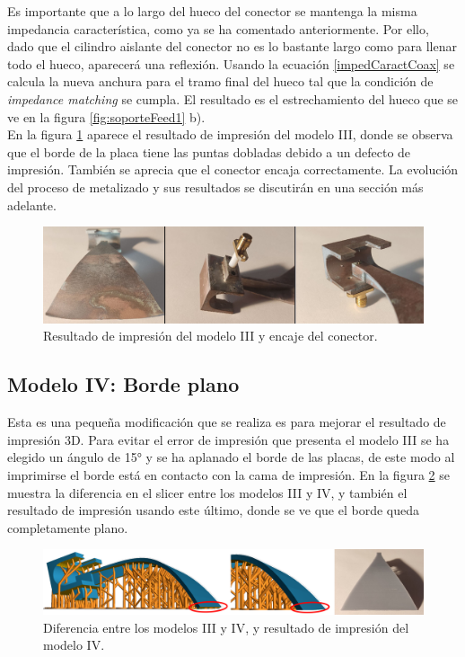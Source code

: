 \documentclass[11pt,a4paper,twoside,pdf]{article}
\numberwithin{equation}{section}
\begin{document}
Es importante que a lo largo del hueco del conector se mantenga la misma impedancia característica, como ya se ha comentado anteriormente. Por ello, dado que el cilindro aislante del conector no es lo bastante largo como para llenar todo el hueco, aparecerá una reflexión. Usando la ecuación \ref{impedCaractCoax} se calcula la nueva anchura para el tramo final del hueco tal que la condición de \textit{impedance matching} se cumpla. El resultado es el estrechamiento del hueco que se ve en la figura \ref{fig:soporteFeed1} b).\\

En la figura \ref{fig:bordeDoblado} aparece el resultado de impresión del modelo III, donde se observa que el borde de la placa tiene las puntas dobladas debido a un defecto de impresión. También se aprecia que el conector encaja correctamente. La evolución del proceso de metalizado y sus resultados se discutirán en una sección más adelante.
\begin{figure}[!h]
    \centering
    \includegraphics[width=\linewidth]{img/modelos/2025_03_19-ConectorV2/bordeDoblado.png}
    \vspace{-0.5cm}
    \caption{Resultado de impresión del modelo III y encaje del conector.}
    \label{fig:bordeDoblado}
\end{figure}

\subsection{Modelo IV: Borde plano}

Esta es una pequeña modificación que se realiza es para mejorar el resultado de impresión 3D. Para evitar el error de impresión que presenta el modelo III se ha elegido un ángulo de 15° y se ha aplanado el borde de las placas, de este modo al imprimirse el borde está en contacto con la cama de impresión. En la figura \ref{fig:aplanado} se muestra la diferencia en el slicer entre los modelos III y IV, y también el resultado de impresión usando este último, donde se ve que el borde queda completamente plano.
\begin{figure}[!h]
    \centering
    \includegraphics[width=\linewidth]{img/modelos/2025_03_19-ConectorV2/planoBienn.png}
    \vspace{-0.5cm}
    \caption{Diferencia entre los modelos III y IV, y resultado de impresión del modelo IV.}
    \label{fig:aplanado}
\end{figure}
\end{document}
